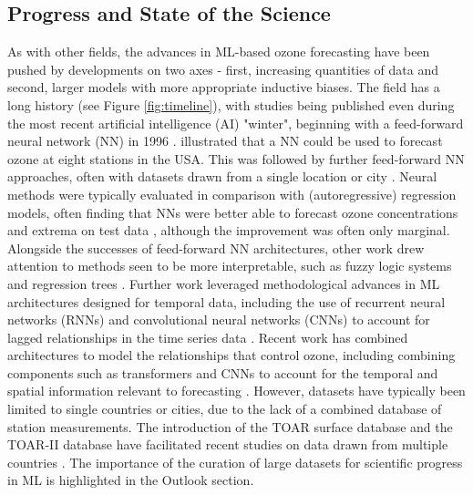 \documentclass[gmd, manuscript]{copernicus}
\begin{document}
\subsection{Progress and State of the Science}

As with other fields, the advances in ML-based ozone forecasting have been pushed by developments on two axes - first, increasing quantities of data and second, larger models with more appropriate inductive biases. The field has a long history (see Figure \ref{fig:timeline}), with studies being published even during the most recent artificial intelligence (AI) "winter", beginning with a feed-forward neural network (NN) in 1996 \citep{Yi1996}. \citet{Comrie1997} illustrated that a NN could be used to forecast ozone at eight stations in the USA. This was followed by further feed-forward NN approaches, often with datasets drawn from a single location or city \citep{cobourn_comparison_2000, Kolehmainen2001}. Neural methods were typically evaluated in comparison with (autoregressive) regression models, often finding that NNs were better able to forecast ozone concentrations and extrema on test data \citep{Nunnari1998, Schlink2003, Chaloulakou2003}, although the improvement was often only marginal. Alongside the successes of feed-forward NN architectures, other work drew attention to methods seen to be more interpretable, such as fuzzy logic systems and regression trees \citep{Gardner2000, heo_new_2004}. Further work leveraged methodological advances in ML architectures designed for temporal data, including the use of recurrent neural networks (RNNs) and convolutional neural networks (CNNs) to account for lagged relationships in the time series data \citep{Eslami2020, sayeed_novel_2021, Kleinert2021}. Recent work has combined architectures to model the relationships that control ozone, including combining components such as transformers and CNNs to account for the temporal and spatial information relevant to forecasting \citep{Chen2022, cheng_spatio-temporal_2022, han_capability_2023}. However, datasets have typically been limited to single countries or cities, due to the lack of a combined database of station measurements. The introduction of the TOAR surface database \citep{Schultz2017} and the TOAR-II database have facilitated recent studies on data drawn from multiple countries \citep{leufen_o3resnet_2023, Hickman2023}. The importance of the curation of large datasets for scientific progress in ML is highlighted in the Outlook section. 
\end{document}
